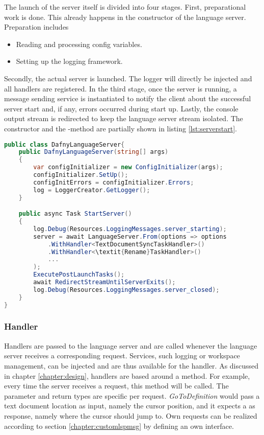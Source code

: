 The launch of the server itself is divided into four stages.
First, preparational work is done.
This already happens in the constructor of the language server.
Preparation includes
\begin{itemize}
    \item Reading and processing config variables.
    \item Setting up the logging framework.
\end{itemize}
Secondly, the actual server is launched.
The logger will directly be injected and all handlers are registered.
In the third stage, once the server is running, a message sending service is instantiated to notify the client about the successful server start and, if any, errors occurred during start up.
Lastly, the console output stream is redirected to keep the language server stream isolated.
The constructor and the -method are partially shown in listing \ref{lst:serverstart}.

\begin{lstlisting}[language=csharp, caption={Starting the Language Server}, captionpos=b, label={lst:serverstart}]
public class DafnyLanguageServer{
    public DafnyLanguageServer(string[] args)
    {
        var configInitializer = new ConfigInitializer(args);
        configInitializer.SetUp();
        configInitErrors = configInitializer.Errors;
        log = LoggerCreator.GetLogger();
    }

    public async Task StartServer()
    {
        log.Debug(Resources.LoggingMessages.server_starting);
        server = await LanguageServer.From(options => options
            .WithHandler<TextDocumentSyncTaskHandler>()
            .WithHandler<\textit{Rename}TaskHandler>()
            ...
        );
        ExecutePostLaunchTasks();
        await RedirectStreamUntilServerExits();
        log.Debug(Resources.LoggingMessages.server_closed);
    }
}
\end{lstlisting}

\subsubsection{Handler}
Handlers are passed to the language server and are called whenever the language server receives a corresponding request.
Services, such logging or workspace management, can be injected and are thus available for the handler.
As discussed in chapter \ref{chapter:design}, handlers are based around a  method.
For example, every time the server receives a  request, this  method will be called.
The parameter and return types are specific per request.
\textit{GoToDefinition} would pass a text document location as input, namely the cursor position, and it expects a  as response,
namely where the cursor should jump to.
Own requests can be realized according to section \ref{chapter:customlspmsg} by defining an own interface.\\

